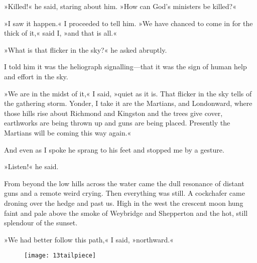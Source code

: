 »Killed!« he said, staring about him. »How can God's ministers be killed?«

»I saw it happen.« I proceeded to tell him. »We have chanced to come in for the thick of it,« said I, »and that is all.«

»What is that flicker in the sky?« he asked abruptly.

I told him it was the heliograph signalling—that it was the sign of human help and effort in the sky.

»We are in the midst of it,« I said, »quiet as it is. That flicker in the sky tells of the gathering storm. Yonder, I take it are the Martians, and Londonward, where those hills rise about Richmond and Kingston and the trees give cover, earthworks are being thrown up and guns are being placed. Presently the Martians will be coming this way again.«

And even as I spoke he sprang to his feet and stopped me by a gesture.

»Listen!« he said.

From beyond the low hills across the water came the dull resonance of distant guns and a remote weird crying. Then everything was still. A cockchafer came droning over the hedge and past us. High in the west the crescent moon hung faint and pale above the smoke of Weybridge and Shepperton and the hot, still splendour of the sunset.

»We had better follow this path,« I said, »northward.«

\begin{figure}[b!]
\centering
\texttt{[image: 13tailpiece]}
\end{figure}